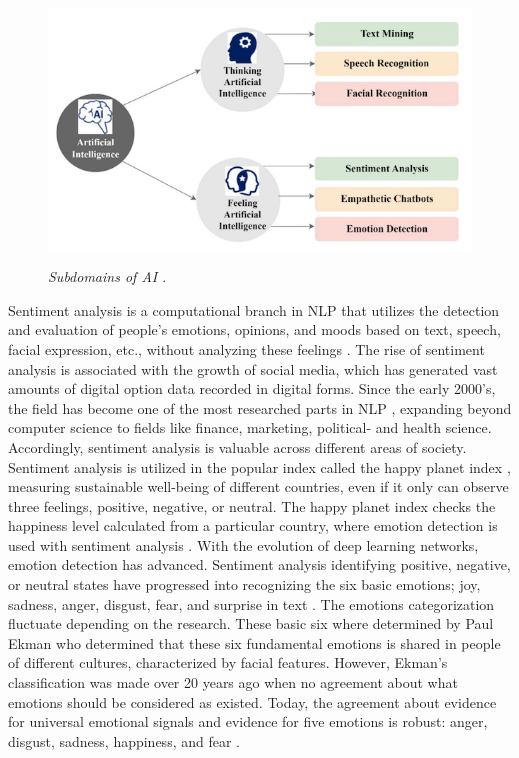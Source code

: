 \begin{figure}[ht]
    \centering
    \includegraphics[height=7cm]{png/subdomains AI.png}
    \caption{\textit{Subdomains of AI \autocite{Kusal2023}}.}
    \label{fig:subdomains-AI}
\end{figure}

Sentiment analysis is a computational branch in NLP that utilizes the detection and evaluation of people’s emotions, opinions, and moods based on text, speech, facial expression, etc., without analyzing these feelings \autocite{Ermakova2023}. The rise of sentiment analysis is associated with the growth of social media, which has generated vast amounts of digital option data recorded in digital forms. Since the early 2000’s, the field has become one of the most researched parts in NLP \autocite{Zhang2018}, expanding beyond computer science to fields like finance, marketing, political- and health science. Accordingly, sentiment analysis is valuable across different areas of society. Sentiment analysis is utilized in the popular index called the happy planet index \autocite{HappyPlanetIndex}, measuring sustainable well-being of different countries, even if it only can observe three feelings, positive, negative, or neutral. The happy planet index checks the happiness level calculated from a particular country, where emotion detection is used with sentiment analysis \autocite{Madhuri2021}.
With the evolution of deep learning networks, emotion detection has advanced. Sentiment analysis identifying positive, negative, or neutral states have progressed into recognizing the six basic emotions; joy, sadness, anger, disgust, fear, and surprise in text \autocite{Safari2023}. The emotions categorization fluctuate depending on the research. These basic six where determined by Paul Ekman \autocite{Oatley2019, Kusal2023} who determined that these six fundamental emotions is shared in people of different cultures, characterized by facial features. However, Ekman’s classification was made over 20 years ago when no agreement about what emotions should be considered as existed. Today, the agreement about evidence for universal emotional signals and evidence for five emotions is robust: anger, disgust, sadness, happiness, and fear \autocite{Ekman2016}.

